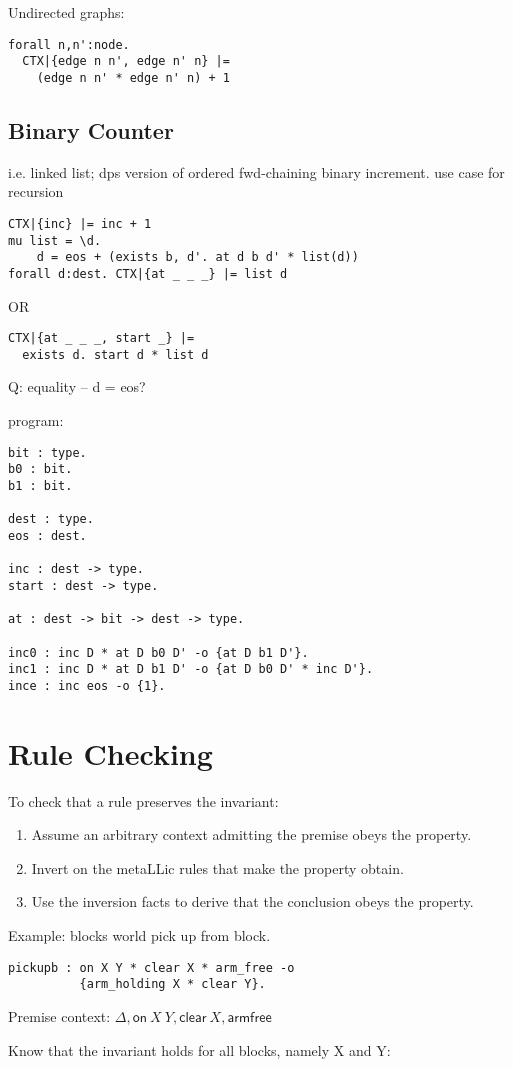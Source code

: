 \documentclass[fullpage, 11pt]{article}
\begin{document}
Undirected graphs:
\begin{verbatim}
forall n,n':node.
  CTX|{edge n n', edge n' n} |=
    (edge n n' * edge n' n) + 1
\end{verbatim}

\subsection*{Binary Counter}
i.e. linked list; dps version of ordered fwd-chaining binary increment.
use case for recursion
\begin{verbatim}
CTX|{inc} |= inc + 1
mu list = \d.
    d = eos + (exists b, d'. at d b d' * list(d))
forall d:dest. CTX|{at _ _ _} |= list d
\end{verbatim}
OR
\begin{verbatim}
CTX|{at _ _ _, start _} |=
  exists d. start d * list d
\end{verbatim}
Q: equality -- d = eos?

program:
\begin{verbatim}
bit : type.
b0 : bit.
b1 : bit.

dest : type.
eos : dest.

inc : dest -> type.
start : dest -> type.

at : dest -> bit -> dest -> type.

inc0 : inc D * at D b0 D' -o {at D b1 D'}.
inc1 : inc D * at D b1 D' -o {at D b0 D' * inc D'}.
ince : inc eos -o {1}.
\end{verbatim}

\section{Rule Checking}

To check that a rule preserves the invariant:

\begin{enumerate}
\item Assume an arbitrary context admitting the premise obeys the property.
\item Invert on the metaLLic rules that make the property obtain. 
\item Use the inversion facts to derive that the conclusion obeys the
property.
\end{enumerate}

Example: blocks world pick up from block.

\begin{verbatim}
pickupb : on X Y * clear X * arm_free -o
          {arm_holding X * clear Y}.
\end{verbatim}

Premise context:
$\Delta, \mathsf{on\ }X\ Y, \mathsf{clear\ }X, \mathsf{armfree}$

Know that the invariant holds for all blocks, namely X and Y:






\end{document}
